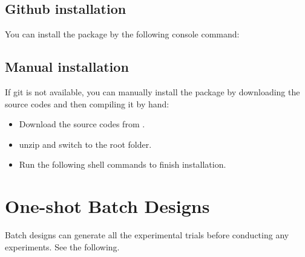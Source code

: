 \documentclass[letterpaper,10pt,english]{sphinxmanual}
\begin{document}
\subsection{Github installation}
\label{\detokenize{installation:github-installation}}
You can install the package by the following console command:

\begin{sphinxVerbatim}[commandchars=\\\{\}]
  
\end{sphinxVerbatim}


\subsection{Manual installation}
\label{\detokenize{installation:manual-installation}}
If git is not available, you can manually install the package by downloading the source codes and then compiling it by hand:
\begin{itemize}
\item {} 
Download the source codes from .

\item {} 
unzip and switch to the root folder.

\item {} 
Run the following shell commands to finish installation.

\end{itemize}

\begin{sphinxVerbatim}[commandchars=\\\{\}]
   
  
\end{sphinxVerbatim}


\section{One-shot Batch Designs}
\label{\detokenize{pybatdoe:one-shot-batch-designs}}\label{\detokenize{pybatdoe::doc}}
Batch designs can generate all the experimental trials before conducting any experiments. See the following.
\end{document}
